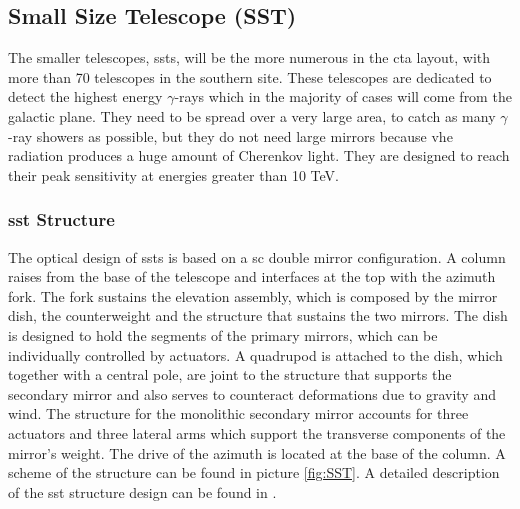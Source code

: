 \documentclass[main.tex]{subfiles}
\begin{document}
\subsection{Small Size Telescope (SST)}

The smaller telescopes, \glspl{sst}, will be the more numerous in the \gls{cta} layout, with more than 70 telescopes in the southern site. These telescopes are dedicated to detect the highest energy $\gamma$-rays which in the majority of cases will come from the galactic plane. They need to be spread over a very large area, to catch as many $\gamma$-ray showers as possible, but they do not need large mirrors because \gls{vhe} radiation produces a huge amount of Cherenkov light. They are designed to reach their peak sensitivity at energies greater than 10 TeV.

\subsubsection{\gls{sst} Structure}

The optical design of \glspl{sst} is based on a \gls{sc} double mirror configuration. A column raises from the base of the telescope and interfaces at the top with the azimuth fork. The fork sustains the elevation assembly, which is composed by the mirror dish, the counterweight and the structure that sustains the two mirrors. The dish is designed to hold the segments of the primary mirrors, which can be individually controlled by actuators. A quadrupod is attached to the dish, which together with a central pole, are joint to the structure that supports the secondary mirror and also serves to counteract deformations due to gravity and wind. The structure for the monolithic secondary mirror accounts for three actuators and three lateral arms which support the transverse components of the mirror's weight. The drive of the azimuth is located at the base of the column. A scheme of the structure can be found in picture \ref{fig:SST}. A detailed description of the \gls{sst} structure design can be found in \cite{2013SSTstruct}.
\end{document}
